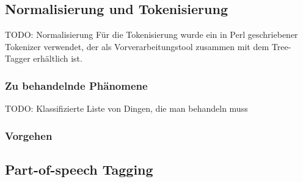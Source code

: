\documentclass[11pt]{article}
\begin{document}
\subsection{Normalisierung und Tokenisierung}
TODO: Normalisierung \newline
Für die Tokenisierung wurde ein in Perl geschriebener Tokenizer verwendet, der
als Vorverarbeitungstool zusammen mit dem Tree-Tagger erhältlich ist.  

\subsubsection{Zu behandelnde Phänomene}

TODO: Klassifizierte Liste von Dingen, die man behandeln muss

\subsubsection{Vorgehen}


\subsection{Part-of-speech Tagging} 
\end{document}
